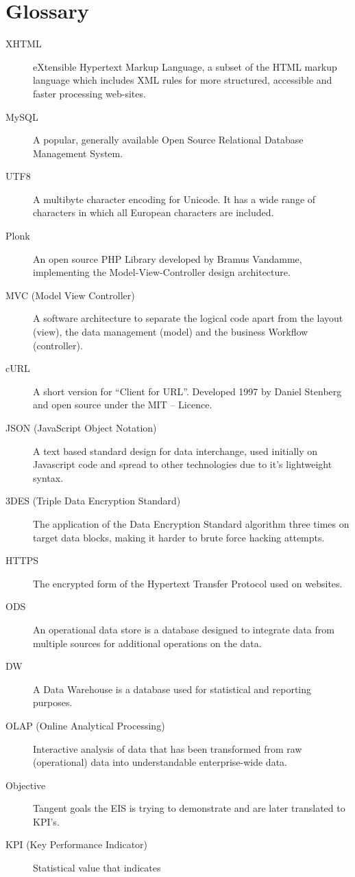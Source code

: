 \chapter*{Glossary}
\begin{description}
\item[XHTML] eXtensible Hypertext Markup Language, a subset of the HTML markup
language which includes XML rules for more structured, accessible and faster
processing web-sites.
\item[MySQL] A popular, generally available Open Source Relational Database
Management System.
\item[UTF8] A multibyte character encoding for Unicode. It has a wide range of
characters in which all European characters are included.
\item[Plonk] An open source PHP Library developed by Bramus Vandamme,
implementing the Model-View-Controller design architecture.
\item[MVC (Model View Controller)] A software architecture to separate the
logical code apart from the layout (view), the data management (model) and the
business Workflow (controller).
\item[cURL] A short version for “Client for URL”. Developed 1997 by Daniel
Stenberg and open source under the MIT – Licence.
\item[JSON (JavaScript Object Notation)] A text based standard design for data
interchange, used initially on Javascript code and spread to other technologies
due to it's lightweight syntax.
\item[3DES (Triple Data Encryption Standard)] The application of the Data
Encryption Standard algorithm three times on target data blocks, making it
harder to brute force hacking attempts. 
\item[HTTPS] The encrypted form of the Hypertext Transfer Protocol used on
websites.
\item[ODS] An operational data store is a database designed to integrate
data from multiple sources for additional operations on the data.
\item[DW] A Data Warehouse is a database used for statistical and reporting
purposes.
\item[OLAP (Online Analytical Processing)] Interactive analysis of data that
has been transformed from raw (operational) data into understandable 
enterprise-wide data.
\item[Objective] Tangent goals the EIS is trying to demonstrate and are later
translated to KPI's.
\item[KPI (Key Performance Indicator)] Statistical value that indicates

\end{description}
